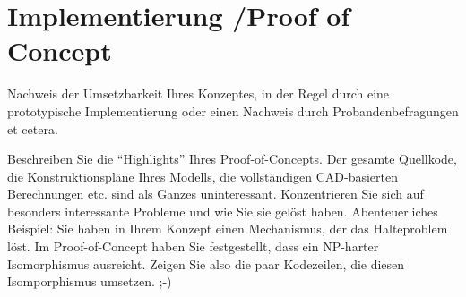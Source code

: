 \chapter[Implementierung / Proof of Concept]{Implementierung /\newline Proof of Concept}\label{chap:ProofOfConcept}
Nachweis der Umsetzbarkeit Ihres Konzeptes, in der Regel durch eine prototypische Implementierung oder einen Nachweis durch Probandenbefragungen et cetera.

Beschreiben Sie die \enquote{Highlights} Ihres Proof-of-Concepts. Der gesamte Quellkode, die Konstruktionspläne Ihres Modells, die vollständigen CAD-basierten Berechnungen etc. sind als Ganzes uninteressant. Konzentrieren Sie sich auf besonders interessante Probleme und wie Sie sie gelöst haben. Abenteuerliches Beispiel: Sie haben in Ihrem Konzept einen Mechanismus, der das Halteproblem löst. Im Proof-of-Concept haben Sie festgestellt, dass ein NP-harter Isomorphismus ausreicht. Zeigen Sie also die paar Kodezeilen, die diesen Isomporphismus umsetzen. ;-)



